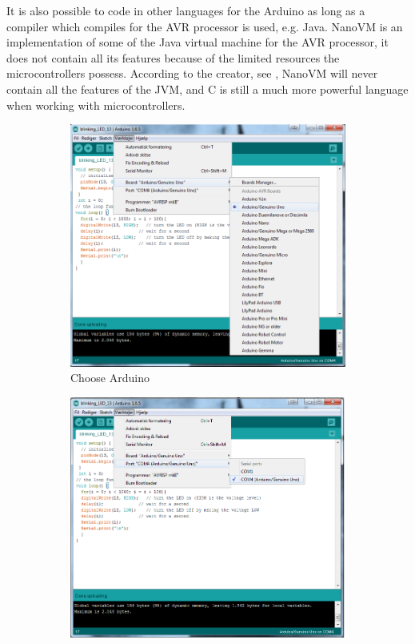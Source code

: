 It is also possible to code in other languages for the Arduino as long as a compiler which compiles for the AVR processor is used, e.g. Java.
NanoVM is an implementation of some of the Java virtual machine for the AVR processor, it does not contain all its features because of the limited resources the microcontrollers possess. 
According to the creator, see \cite{NanoVM}, NanoVM will never contain all the features of the JVM, and C is still a much more powerful language when working with microcontrollers. 


\begin{figure}[!ht]
    \begin{subfigure}{0.47\linewidth}
        \centering
        \includegraphics[width=\linewidth]{Figures/ChooseArduino.png}
        \caption{Choose Arduino}
        \label{fig:choose_arduino}
    \end{subfigure}\hfill
    \begin{subfigure}{0.47\linewidth}
        \centering
        \includegraphics[width=\linewidth]{Figures/ChoosePort.png}

\end{subfigure}
\end{figure}
